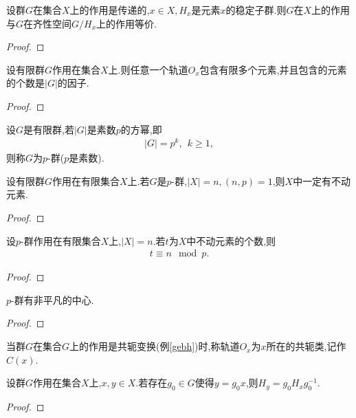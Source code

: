 \begin{corollary}
    设群$G$在集合$X$上的作用是传递的,$x\in X,H_x$是元素$x$的稳定子群.则$G$在$X$上的作用与$G$在齐性空间$G/H_x$上的作用等价.
\end{corollary}
\begin{proof}
    \stars
\end{proof}
\begin{corollary}
    设有限群$G$作用在集合$X$上.则任意一个轨道$O_x$包含有限多个元素,并且包含的元素的个数是$|G|$的因子.
\end{corollary}
\begin{proof}
    \stars
\end{proof}
\begin{definition}[$p$-群]
    设$G$是有限群,若$|G|$是素数$p$的方幂,即\begin{align*}
        |G|=p^k,\ \ k\geq1,
    \end{align*}则称$G$为$p$-群($p$是素数).
\end{definition}
\begin{corollary}\label{p77tl3}
    设有限群$G$作用在有限集合$X$上.若$G$是$p$-群,$|X|=n,(n,p)=1$,则$X$中一定有不动元素.
\end{corollary}
\begin{proof}
    \stars
\end{proof}
\begin{corollary}\label{p77tl4}
    设$p$-群作用在有限集合$X$上,$|X|=n$.若$t$为$X$中不动元素的个数,则\begin{align*}
        t\equiv n\mod p.
    \end{align*}
\end{corollary}
\begin{proof}
    \stars
\end{proof}
\begin{corollary}
    $p$-群有非平凡的中心.
\end{corollary}
\begin{proof}
    \stars
\end{proof}
\begin{definition}[共轭类]
    当群$G$在集合$G$上的作用是共轭变换(例\ref{gebh})时,称轨道$O_x$为$x$所在的共轭类,记作$C(x)$.
\end{definition}
\begin{theorem}
    设群$G$作用在集合$X$上,$x,y\in X$.若存在$g_0\in G$使得$y=g_0x$,则$H_y=g_0H_xg_0^{-1}$.
\end{theorem}
\begin{proof}
    \stars
\end{proof}
